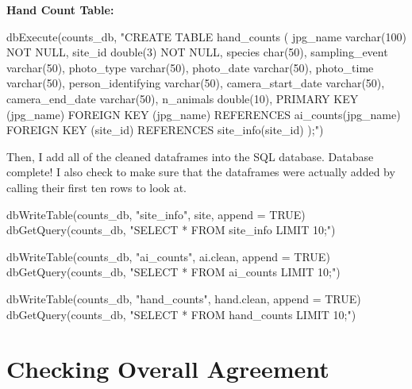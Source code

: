 \documentclass[
]{book}
\newenvironment{Shaded}{\begin{snugshade}}{\end{snugshade}}
\newcommand{\AttributeTok}[1]{\textcolor[rgb]{0.77,0.63,0.00}{#1}}
\newcommand{\ConstantTok}[1]{\textcolor[rgb]{0.00,0.00,0.00}{#1}}
\newcommand{\FunctionTok}[1]{\textcolor[rgb]{0.00,0.00,0.00}{#1}}
\newcommand{\NormalTok}[1]{#1}
\newcommand{\StringTok}[1]{\textcolor[rgb]{0.31,0.60,0.02}{#1}}
\begin{document}
\textbf{Hand Count Table:}

\begin{Shaded}
\begin{Highlighting}[]
\FunctionTok{dbExecute}\NormalTok{(counts\_db, }
\StringTok{"CREATE TABLE hand\_counts (}
\StringTok{ jpg\_name varchar(100) NOT NULL,}
\StringTok{ site\_id double(3) NOT NULL,}
\StringTok{ species char(50),}
\StringTok{ sampling\_event varchar(50),}
\StringTok{ photo\_type varchar(50),}
\StringTok{ photo\_date varchar(50),}
\StringTok{ photo\_time varchar(50),}
\StringTok{ person\_identifying varchar(50),}
\StringTok{ camera\_start\_date varchar(50),}
\StringTok{ camera\_end\_date varchar(50),}
\StringTok{ n\_animals double(10),}
\StringTok{ PRIMARY KEY (jpg\_name)}
\StringTok{ FOREIGN KEY (jpg\_name) REFERENCES ai\_counts(jpg\_name)}
\StringTok{ FOREIGN KEY (site\_id) REFERENCES site\_info(site\_id)}
\StringTok{);"}\NormalTok{)}
\end{Highlighting}
\end{Shaded}

Then, I add all of the cleaned dataframes into the SQL database. Database complete! I also check to make sure that the dataframes were actually added by calling their first ten rows to look at.

\begin{Shaded}
\begin{Highlighting}[]
\FunctionTok{dbWriteTable}\NormalTok{(counts\_db, }\StringTok{"site\_info"}\NormalTok{, site, }\AttributeTok{append =} \ConstantTok{TRUE}\NormalTok{)}
\FunctionTok{dbGetQuery}\NormalTok{(counts\_db, }\StringTok{"SELECT * FROM site\_info LIMIT 10;"}\NormalTok{)}

\FunctionTok{dbWriteTable}\NormalTok{(counts\_db, }\StringTok{"ai\_counts"}\NormalTok{, ai.clean, }\AttributeTok{append =} \ConstantTok{TRUE}\NormalTok{)}
\FunctionTok{dbGetQuery}\NormalTok{(counts\_db, }\StringTok{"SELECT * FROM ai\_counts LIMIT 10;"}\NormalTok{)}

\FunctionTok{dbWriteTable}\NormalTok{(counts\_db, }\StringTok{"hand\_counts"}\NormalTok{, hand.clean, }\AttributeTok{append =} \ConstantTok{TRUE}\NormalTok{)}
\FunctionTok{dbGetQuery}\NormalTok{(counts\_db, }\StringTok{"SELECT * FROM hand\_counts LIMIT 10;"}\NormalTok{)}
\end{Highlighting}
\end{Shaded}

\hypertarget{overall}{%
\chapter{Checking Overall Agreement}\label{overall}}
\end{document}
